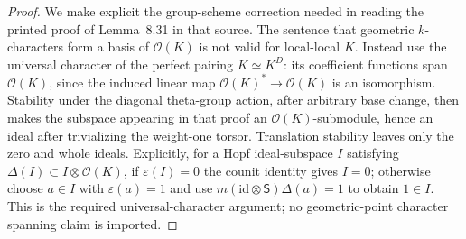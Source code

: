 \begin{proof}
We make explicit the group-scheme correction needed in reading the
printed proof of Lemma~8.31 in that source.  The sentence that geometric
\(k\)-characters form a basis of \(\mathcal O(K)\) is not valid for
local-local \(K\).  Instead use the universal character of the perfect
pairing \(K\simeq K^D\): its coefficient functions span
\(\mathcal O(K)\), since the induced linear map
\(\mathcal O(K)^*\to\mathcal O(K)\) is an isomorphism.  Stability
under the diagonal theta-group action, after arbitrary base change,
then makes the subspace appearing in that proof an
\(\mathcal O(K)\)-submodule, hence an ideal after trivializing the
weight-one torsor.  Translation stability leaves only the zero and
whole ideals.  Explicitly, for a Hopf ideal-subspace \(I\) satisfying
\(\Delta(I)\subset I\otimes\mathcal O(K)\), if
\(\varepsilon(I)=0\) the counit identity gives \(I=0\); otherwise
choose \(a\in I\) with \(\varepsilon(a)=1\) and use
\(m(\mathrm{id}\otimes\mathsf S)\Delta(a)=1\) to obtain \(1\in I\).
This is the required universal-character argument; no geometric-point
character spanning claim is imported.
\end{proof}

